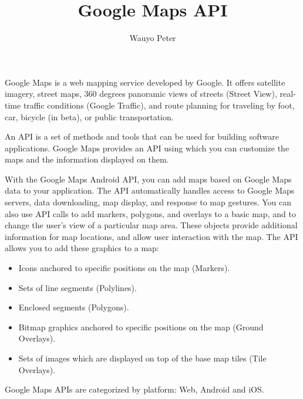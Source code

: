 \documentclass[10pt,a4paper]{article}
\author{Wauyo Peter}
\title{Google Maps API}
\begin{document}
\maketitle

\begin{flushleft}
Google Maps is a web mapping service developed by Google\cite{1}. It offers satellite imagery, street maps, 360 degrees panoramic views of streets (Street View), real-time traffic conditions (Google Traffic), and route planning for traveling by foot, car, bicycle (in beta), or public transportation.\cite{2}
\end{flushleft}

\begin{flushleft}
An API is a set of methods and tools that can be used for building software applications.
Google Maps provides an API using which you can customize the maps and the information displayed on them.\cite{3}
\end{flushleft}

\begin{flushleft}
With the Google Maps Android API, you can add maps based on Google Maps data to your application. The API automatically handles access to Google Maps servers, data downloading, map display, and response to map gestures. You can also use API calls to add markers, polygons, and overlays to a basic map, and to change the user's view of a particular map area. These objects provide additional information for map locations, and allow user interaction with the map. The API allows you to add these graphics to a map:
\begin{itemize}
	\item Icons anchored to specific positions on the map (Markers).
	\item Sets of line segments (Polylines).
    \item Enclosed segments (Polygons).
    \item Bitmap graphics anchored to specific positions on the map (Ground Overlays).
    \item Sets of images which are displayed on top of the base map tiles (Tile Overlays).\cite{4}
\end{itemize}
\end{flushleft}

\begin{flushleft}
Google Maps APIs are categorized by platform: Web, Android and iOS.\cite{5}
\end{flushleft}



\end{document}
